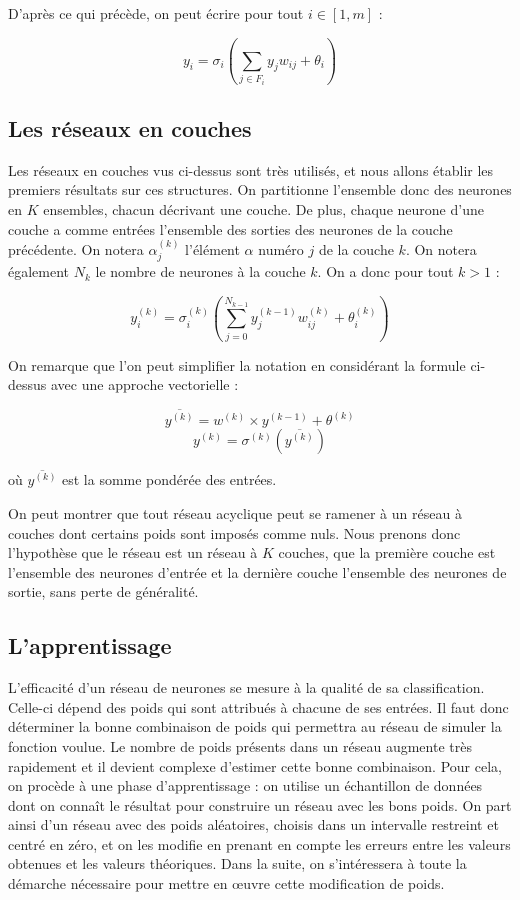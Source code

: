 \medskip

D'après ce qui précède, on peut écrire pour tout $i \in [1, m]$ :

\[y_i = \sigma_i(\sum_{j \in F_i} y_jw_{ij} + \theta_i) \]

\subsection{Les réseaux en couches}

Les réseaux en couches vus ci-dessus sont très utilisés, et nous allons établir
les premiers résultats sur ces structures. On partitionne l'ensemble donc
des neurones en $K$ ensembles, chacun décrivant une couche. De plus,
chaque neurone d'une couche a comme entrées l'ensemble des sorties
des neurones de la couche précédente. On notera $\alpha^{(k)}_j$ l'élément $\alpha$
numéro $j$ de la couche $k$. On notera également $N_k$ le nombre de neurones à
la couche $k$. On a donc pour tout $k > 1$ :

\[y_i^{(k)} = \sigma_i^{(k)}(\sum_{j = 0}^{N_{k-1}} y_j^{(k-1)}w_{ij}^{(k)} + \theta_i^{(k)}) \]

On remarque que l'on peut simplifier la notation en considérant la formule
ci-dessus avec une approche vectorielle :

\[\overline{y^{(k)}} = w^{(k)} \times y^{(k-1)} + \theta^{(k)}\]
\[y^{(k)} = \sigma^{(k)}(\overline{y^{(k)}}) \]

où $\overline{y^{(k)}}$ est la somme pondérée des entrées.

On peut montrer que tout réseau acyclique peut se ramener à un réseau à couches
dont certains poids sont imposés comme nuls. Nous prenons donc l'hypothèse que
le réseau est un réseau à $K$ couches, que la première couche est l'ensemble des
 neurones d'entrée et la dernière couche l'ensemble des neurones de sortie, sans
 perte de généralité.

\subsection{L'apprentissage}

L'efficacité d'un réseau de neurones se mesure à la qualité de sa classification.
Celle-ci dépend des poids qui sont attribués à chacune de ses entrées. Il faut
donc déterminer la bonne combinaison de poids qui permettra au réseau de
simuler la fonction voulue. Le nombre de poids présents dans un réseau augmente
très rapidement et il devient complexe d'estimer cette bonne combinaison. Pour
cela, on procède à une phase d'apprentissage : on utilise un échantillon de
données dont on connaît le résultat pour construire un réseau avec les bons poids.
On part ainsi d'un réseau avec des poids aléatoires, choisis dans un
intervalle restreint et centré en zéro, et on les modifie en prenant en compte
les erreurs entre les valeurs obtenues et les valeurs théoriques. Dans la suite,
on s'intéressera à toute la démarche nécessaire pour mettre en œuvre cette
modification de poids.

